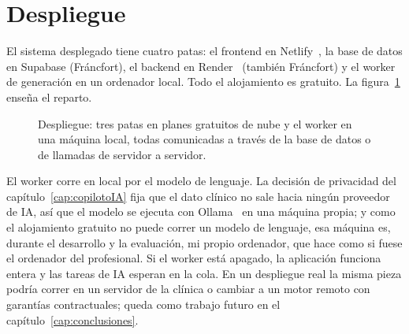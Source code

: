 \section{Despliegue}
\label{sec:despliegue}

El sistema desplegado tiene cuatro patas: el frontend en Netlify~\citep{netlify}, la base de datos en Supabase (Fráncfort), el backend en Render~\citep{render} (también Fráncfort) y el worker de generación en un ordenador local. Todo el alojamiento es gratuito. La figura~\ref{fig:despliegue} enseña el reparto.

\begin{figure}[htbp]
\begin{center}
\caption{Despliegue: tres patas en planes gratuitos de nube y el worker en una máquina local, todas comunicadas a través de la base de datos o de llamadas de servidor a servidor.}
\label{fig:despliegue}
\end{center}
\end{figure}

El worker corre en local por el modelo de lenguaje. La decisión de privacidad del capítulo~\ref{cap:copilotoIA} fija que el dato clínico no sale hacia ningún proveedor de IA, así que el modelo se ejecuta con Ollama~\citep{ollama} en una máquina propia; y como el alojamiento gratuito no puede correr un modelo de lenguaje, esa máquina es, durante el desarrollo y la evaluación, mi propio ordenador, que hace como si fuese el ordenador del profesional. Si el worker está apagado, la aplicación funciona entera y las tareas de IA esperan en la cola. En un despliegue real la misma pieza podría correr en un servidor de la clínica o cambiar a un motor remoto con garantías contractuales; queda como trabajo futuro en el capítulo~\ref{cap:conclusiones}.

